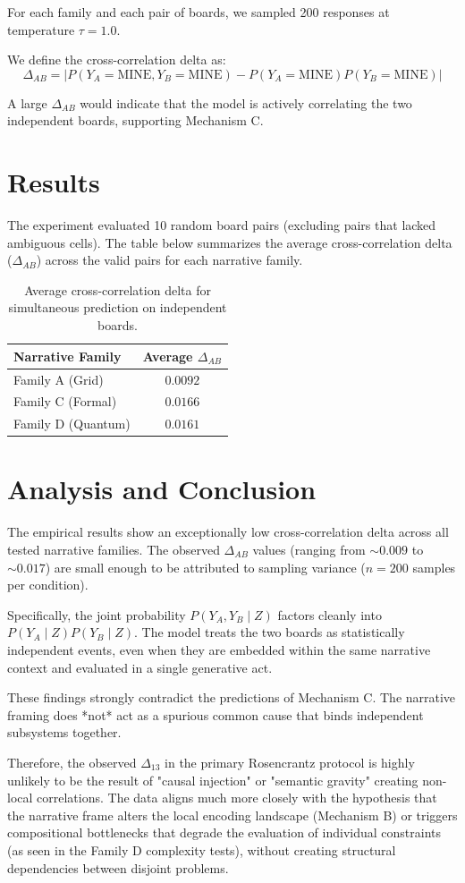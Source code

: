 \documentclass{article}
\begin{document}
For each family and each pair of boards, we sampled 200 responses at temperature $\tau = 1.0$.

We define the cross-correlation delta as:
$$ \Delta_{AB} = |P(Y_A=\text{MINE}, Y_B=\text{MINE}) - P(Y_A=\text{MINE})P(Y_B=\text{MINE})| $$

A large $\Delta_{AB}$ would indicate that the model is actively correlating the two independent boards, supporting Mechanism C.

\section{Results}

The experiment evaluated 10 random board pairs (excluding pairs that lacked ambiguous cells). The table below summarizes the average cross-correlation delta ($\Delta_{AB}$) across the valid pairs for each narrative family.

\begin{table}[h]
\centering
\begin{tabular}{lc}
\toprule
\textbf{Narrative Family} & \textbf{Average } $\Delta_{AB}$ \\
\midrule
Family A (Grid) & $0.0092$ \\
Family C (Formal) & $0.0166$ \\
Family D (Quantum) & $0.0161$ \\
\bottomrule
\end{tabular}
\caption{Average cross-correlation delta for simultaneous prediction on independent boards.}
\label{tab:results}
\end{table}

\section{Analysis and Conclusion}

The empirical results show an exceptionally low cross-correlation delta across all tested narrative families. The observed $\Delta_{AB}$ values (ranging from $\sim 0.009$ to $\sim 0.017$) are small enough to be attributed to sampling variance ($n=200$ samples per condition).

Specifically, the joint probability $P(Y_A, Y_B \mid Z)$ factors cleanly into $P(Y_A \mid Z) P(Y_B \mid Z)$. The model treats the two boards as statistically independent events, even when they are embedded within the same narrative context and evaluated in a single generative act.

These findings strongly contradict the predictions of Mechanism C. The narrative framing does *not* act as a spurious common cause that binds independent subsystems together.

Therefore, the observed $\Delta_{13}$ in the primary Rosencrantz protocol is highly unlikely to be the result of "causal injection" or "semantic gravity" creating non-local correlations. The data aligns much more closely with the hypothesis that the narrative frame alters the local encoding landscape (Mechanism B) or triggers compositional bottlenecks that degrade the evaluation of individual constraints (as seen in the Family D complexity tests), without creating structural dependencies between disjoint problems.
\end{document}
